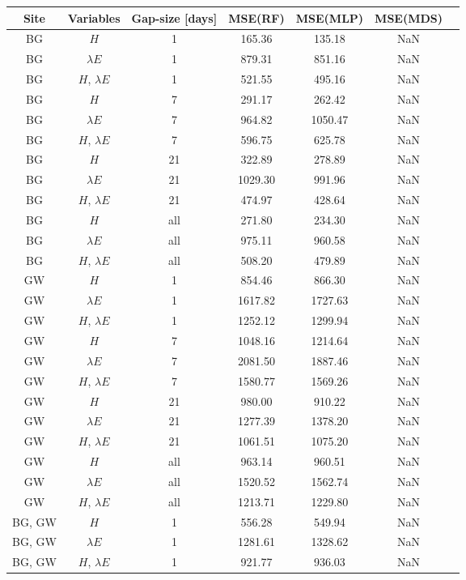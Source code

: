 \begin{tabular}{|c|c|c|c|c|c|c|}
\toprule
Site & Variables & Gap-size [days] & MSE(RF) & MSE(MLP) & MSE(MDS) \\
\midrule
BG & $H$ & 1 & 165.36 & 135.18 & NaN \\
BG & $\lambda E$ & 1 & 879.31 & 851.16 & NaN \\
BG & $H$, $\lambda E$ & 1 & 521.55 & 495.16 & NaN \\
BG & $H$ & 7 & 291.17 & 262.42 & NaN \\
BG & $\lambda E$ & 7 & 964.82 & 1050.47 & NaN \\
BG & $H$, $\lambda E$ & 7 & 596.75 & 625.78 & NaN \\
BG & $H$ & 21 & 322.89 & 278.89 & NaN \\
BG & $\lambda E$ & 21 & 1029.30 & 991.96 & NaN \\
BG & $H$, $\lambda E$ & 21 & 474.97 & 428.64 & NaN \\
BG & $H$ & all & 271.80 & 234.30 & NaN \\
BG & $\lambda E$ & all & 975.11 & 960.58 & NaN \\
BG & $H$, $\lambda E$ & all & 508.20 & 479.89 & NaN \\
GW & $H$ & 1 & 854.46 & 866.30 & NaN \\
GW & $\lambda E$ & 1 & 1617.82 & 1727.63 & NaN \\
GW & $H$, $\lambda E$ & 1 & 1252.12 & 1299.94 & NaN \\
GW & $H$ & 7 & 1048.16 & 1214.64 & NaN \\
GW & $\lambda E$ & 7 & 2081.50 & 1887.46 & NaN \\
GW & $H$, $\lambda E$ & 7 & 1580.77 & 1569.26 & NaN \\
GW & $H$ & 21 & 980.00 & 910.22 & NaN \\
GW & $\lambda E$ & 21 & 1277.39 & 1378.20 & NaN \\
GW & $H$, $\lambda E$ & 21 & 1061.51 & 1075.20 & NaN \\
GW & $H$ & all & 963.14 & 960.51 & NaN \\
GW & $\lambda E$ & all & 1520.52 & 1562.74 & NaN \\
GW & $H$, $\lambda E$ & all & 1213.71 & 1229.80 & NaN \\
BG, GW & $H$ & 1 & 556.28 & 549.94 & NaN \\
BG, GW & $\lambda E$ & 1 & 1281.61 & 1328.62 & NaN \\
BG, GW & $H$, $\lambda E$ & 1 & 921.77 & 936.03 & NaN \\

\end{tabular}
